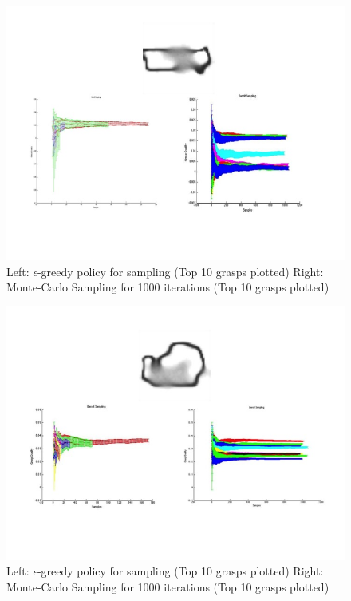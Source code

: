 \documentclass[letterpaper, 10 pt, conference]{ieeeconf}  %
\begin{document}
\begin{figure}[ht!]
\centering
\includegraphics[scale = 0.3]{figures/Slide09.jpg}
\caption{Left: $\epsilon$-greedy policy for sampling (Top 10 grasps plotted)
Right: Monte-Carlo Sampling for 1000 iterations (Top 10 grasps plotted)}
\vspace*{-10pt}
\label{fig:marker_bandit}
\end{figure}


\begin{figure}[ht!]
\centering
\includegraphics[scale = 0.3]{figures/Slide10.jpg}
\caption{Left: $\epsilon$-greedy policy for sampling (Top 10 grasps plotted)
Right: Monte-Carlo Sampling for 1000 iterations (Top 10 grasps plotted)}
\vspace*{-10pt}
\label{fig:tape_bandit}
\end{figure}



\end{document}
